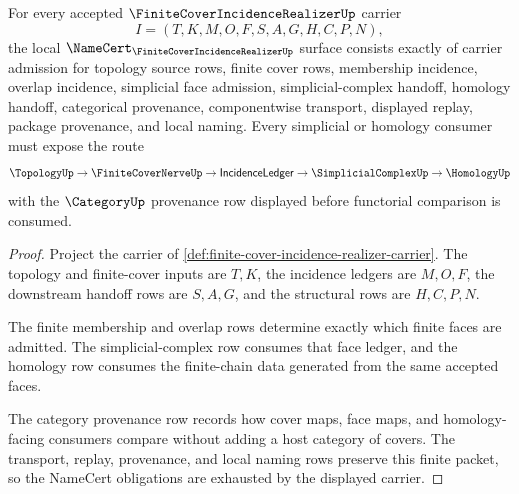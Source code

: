 \begin{theorem}
\label{thm:finite-cover-incidence-realizer-namecert-obligations}
For every accepted $\FiniteCoverIncidenceRealizerUp$ carrier
$$
I=(T,K,M,O,F,S,A,G,H,C,P,N),
$$
the local $\NameCert_{\FiniteCoverIncidenceRealizerUp}$ surface consists exactly of carrier admission for topology source rows, finite cover rows, membership incidence, overlap incidence, simplicial face admission, simplicial-complex handoff, homology handoff, categorical provenance, componentwise transport, displayed replay, package provenance, and local naming. Every simplicial or homology consumer must expose the route
$$
\TopologyUp \to \FiniteCoverNerveUp \to \mathsf{IncidenceLedger} \to \SimplicialComplexUp \to \HomologyUp
$$
with the $\CategoryUp$ provenance row displayed before functorial comparison is consumed.
\end{theorem}
\begin{proof}
Project the carrier of \autoref{def:finite-cover-incidence-realizer-carrier}. The topology and finite-cover inputs are $T,K$, the incidence ledgers are $M,O,F$, the downstream handoff rows are $S,A,G$, and the structural rows are $H,C,P,N$.

The finite membership and overlap rows determine exactly which finite faces are admitted. The simplicial-complex row consumes that face ledger, and the homology row consumes the finite-chain data generated from the same accepted faces.

The category provenance row records how cover maps, face maps, and homology-facing consumers compare without adding a host category of covers. The transport, replay, provenance, and local naming rows preserve this finite packet, so the NameCert obligations are exhausted by the displayed carrier.
\end{proof}



